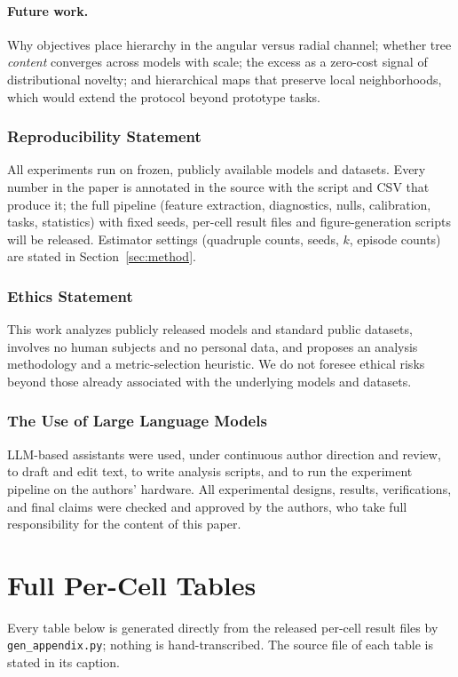 \documentclass{article} %
\begin{document}
\paragraph{Future work.} Why objectives place hierarchy in the angular versus radial channel; whether tree \emph{content} converges across models with scale; the excess as a zero-cost signal of distributional novelty; and hierarchical maps that preserve local neighborhoods, which would extend the protocol beyond prototype tasks.

\subsubsection*{Reproducibility Statement}
All experiments run on frozen, publicly available models and datasets. Every number in the paper is annotated in the source with the script and CSV that produce it; the full pipeline (feature extraction, diagnostics, nulls, calibration, tasks, statistics) with fixed seeds, per-cell result files and figure-generation scripts will be released. Estimator settings (quadruple counts, seeds, $k$, episode counts) are stated in Section~\ref{sec:method}.

\subsubsection*{Ethics Statement}
This work analyzes publicly released models and standard public datasets, involves no human subjects and no personal data, and proposes an analysis methodology and a metric-selection heuristic. We do not foresee ethical risks beyond those already associated with the underlying models and datasets.

\subsubsection*{The Use of Large Language Models}
LLM-based assistants were used, under continuous author direction and review, to draft and edit text, to write analysis scripts, and to run the experiment pipeline on the authors' hardware. All experimental designs, results, verifications, and final claims were checked and approved by the authors, who take full responsibility for the content of this paper.




\appendix
\section{Full Per-Cell Tables}
Every table below is generated directly from the released per-cell result files by \texttt{gen\_appendix.py}; nothing is hand-transcribed. The source file of each table is stated in its caption.
\end{document}
